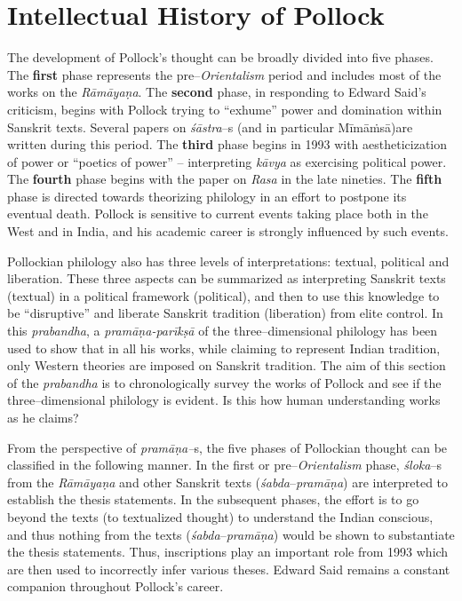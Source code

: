 
\chapter{Intellectual History of Pollock}\label{Anubandha1}

The development of Pollock’s thought can be broadly divided into five phases. The \textbf{first} phase represents the pre–\textit{Orientalism} period and includes most of the works on the \textit{Rāmāyaṇa}. The \textbf{second }phase, in responding to Edward Said’s criticism, begins with Pollock trying to “exhume” power and domination within Sanskrit texts. Several papers on \textit{śāstra}–s (and in particular Mīmāṁsā)are written during this period. The \textbf{third} phase begins in 1993 with aestheticization of power or “poetics of power” – interpreting \textit{kāvya} as exercising political power. The \textbf{fourth} phase begins with the paper on \textit{Rasa} in the late nineties. The \textbf{fifth} phase is directed towards theorizing philology in an effort to postpone its eventual death. Pollock is sensitive to current events taking place both in the West and in India, and his academic career is strongly influenced by such events.

Pollockian philology also has three levels of interpretations: textual, political and liberation. These three aspects can be summarized as interpreting Sanskrit texts (textual) in a political framework (political), and then to use this knowledge to be “disruptive” and liberate Sanskrit tradition (liberation) from elite control. In this \textit{prabandha}, a \textit{pramāṇa-parīkṣā} of the three–dimensional philology has been used to show that in all his works, while claiming to represent Indian tradition, only Western theories are imposed on Sanskrit tradition. The aim of this section of the \textit{prabandha} is to chronologically survey the works of Pollock and see if the three–dimensional philology is evident. Is this how human understanding works as he claims?

\newpage

From the perspective of \textit{pramāṇa–}s, the five phases of Pollockian thought can be classified in the following manner. In the first or pre–\textit{Orientalism} phase, \textit{śloka}–s from the \textit{Rāmāyaṇa} and other Sanskrit texts (\textit{śabda}–\textit{pramāṇa}) are interpreted to establish the thesis statements. In the subsequent phases, the effort is to go beyond the texts (to textualized thought) to understand the Indian conscious, and thus nothing from the texts (\textit{śabda}–\textit{pramāṇa}) would be shown to substantiate the thesis statements. Thus, inscriptions play an important role from 1993 which are then used to incorrectly infer various theses. Edward Said remains a constant companion throughout Pollock’s career.

